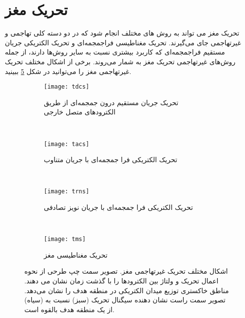 \section{تحریک مغز}

تحریک مغز می تواند به روش های مختلف انجام شود که در دو دسته کلی تهاجمی و غیرتهاجمی جای می‌گیرند. تحریک مغناطیسی فراجمجمه‌ای 
و تحریک الکتریکی جریان مستقیم فراجمجمه‌ای
که کاربرد بیشتری نسبت به سایر روش‌ها دارند، از جمله روش‌های غیرتهاجمی تحریک مغز به شمار می‌روند.
برخی از اشکال مختلف تحریک غیرتهاجمی مغز را می‌توانید در شکل 
\ref{fig:nibs}
ببینید.

\begin{figure}
     \centering
     \begin{subfigure}[t]{0.7\textwidth}
         \centering
         \texttt{[image: tdcs]}
         \caption{تحریک جریان مستقیم درون جمجمه‌ای از طریق الکترودهای متصل خارجی }
         \label{fig:tdcs}
     \end{subfigure}
     \\
     \begin{subfigure}[t]{0.7\textwidth}
         \centering
         \texttt{[image: tacs]}
         \caption{    تحریک الکتریکی فرا جمجمه‌ای با جریان متناوب }
         \label{fig:tacs}
     \end{subfigure}
     \\
     \begin{subfigure}[t]{0.7\textwidth}
         \centering
         \texttt{[image: trns]}
         \caption{    تحریک الکتریکی فرا جمجمه‌ای با جریان نویز تصادفی}
         \label{fig:trns}
     \end{subfigure}
     \\
         \begin{subfigure}[t]{0.7\textwidth}
         \centering
         \texttt{[image: tms]}
         \caption{تحریک مغناطیسی مغز}
         \label{fig:tms}
     \end{subfigure}
        \caption{اشکال مختلف تحریک غیرتهاجمی مغز. تصویر سمت چپ طرحی از نحوه اعمال تحریک و ولتاژ بین الکترودها را با گذشت زمان نشان می دهند. مناطق خاکستری توزیع میدان الکتریکی  در منطقه هدف را نشان می‌دهد. تصویر سمت راست نشان دهنده سیگنال تحریک (سبز) نسبت به  (سیاه) از یک منطقه هدف بالقوه است.
         }
        \label{fig:nibs}
\end{figure}


